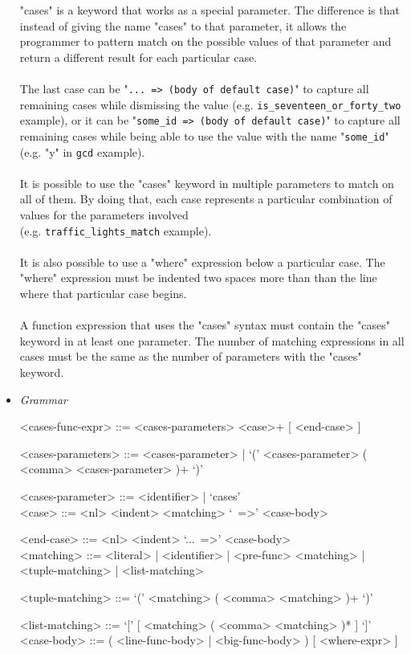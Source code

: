 \documentclass{article}
\begin{document}
\begin{itemize}
"cases" is a keyword that works as a special parameter. The difference is that
instead of giving the name "cases" to that parameter, it allows the programmer
to pattern match on the possible values of that parameter and return a
different result for each particular case. 
\\\\
The last case can be "\texttt{... => (body of default case)}" to capture all
remaining cases while dismissing the value (e.g.
\texttt{is_seventeen_or_forty_two} example), or it can be
"\texttt{some_id => (body of default case)}" to capture all remaining
cases while being able to use the value with the name "\texttt{some_id}"
(e.g.  "y" in \texttt{gcd} example).
\\\\
It is possible to use the "cases" keyword in multiple parameters to match on all
of them. By doing that, each case represents a particular combination of values
for the parameters involved\\(e.g. \texttt{traffic_lights_match} example).
\\\\
It is also possible to use a "where" expression below a particular case. The
"where" expression must be indented two spaces more than than the line where
that particular case begins.
\\\\
A function expression that uses the "cases" syntax must contain the "cases"
keyword in at least one parameter. The number of matching expressions in 
all cases must be the same as the number of parameters with the "cases" keyword.

\item \textit{Grammar}
\begin{grammar}
<cases-func-expr> ::= <cases-parameters> <case>+ [ <end-case> ]

<cases-parameters> ::=
<cases-parameter> | `(' <cases-parameter> ( <comma> <cases-parameter> )+ `)'

<cases-parameter> ::= <identifier> | `cases'
\\

<case> ::=  <nl> <indent> <matching> `\ =>' <case-body>

<end-case> ::= <nl> <indent> `...\ =>' <case-body>
\\

<matching> ::= 
<literal> | <identifier> | <pre-func> <matching> | <tuple-matching> |
<list-matching>

<tuple-matching> ::= `(' <matching> ( <comma> <matching> )+ `)'

<list-matching> ::= `[' [ <matching> ( <comma> <matching> )* ] `]'
\\

<case-body> ::= ( <line-func-body> | <big-func-body> ) [ <where-expr> ]
\end{grammar}

\end{itemize}
\end{document}
